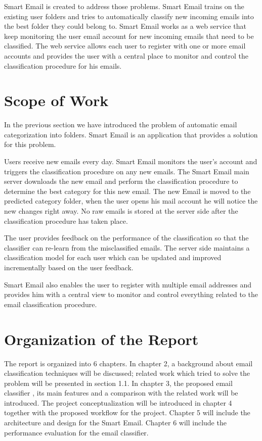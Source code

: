 	Smart Email is created to address those problems. Smart Email trains on the existing user folders and tries to automatically classify new incoming emails into the best folder they could belong to. Smart Email works as a web service that keep monitoring the user email account for new incoming emails that need to be classified. The web service allows each user to register with one or more email accounts and provides the user with a central place to monitor and control the classification procedure for his emails.

\section{Scope of Work}

In the previous section we have introduced the problem of automatic email categorization into folders. Smart Email is an application that provides a solution for this problem.

Users receive new emails every day. Smart Email monitors the user's account and triggers the classification procedure on any new emails. The Smart Email main server downloads the new email and perform the classification procedure to determine the best category for this new email. The new Email is moved to the predicted category folder, when the user opens his mail account he will notice the new changes right away. No raw emails is stored at the server side after the classification procedure has taken place.

The user provides feedback on the performance of the classification so that the classifier can re-learn from the misclassified emails. The server side maintains a classification model for each user which can be updated and improved incrementally based on the user feedback.

	Smart Email also enables the user to register with multiple email addresses and provides him with a central view to monitor and control everything related to the email classification procedure.


\section{Organization of the Report}

The report is organized into 6 chapters. In chapter 2, a background about email classification techniques will be discussed; related work which tried to solve the problem will be presented in section 1.1. In chapter 3, the proposed email classifier , its main features and a comparison with the related work will be introduced. The project conceptualization will be introduced in chapter 4 together with the proposed workflow for the project. Chapter 5 will include the architecture and design for the Smart Email. Chapter 6 will include the performance evaluation for the email classifier.
